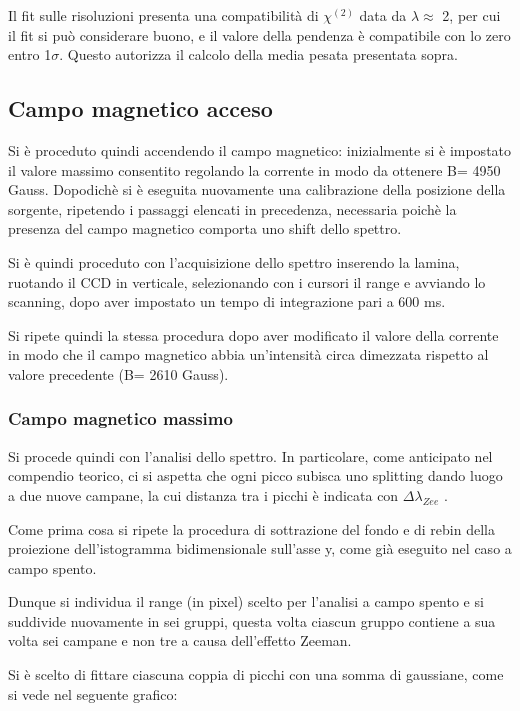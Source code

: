 \documentclass{article}
\begin{document}
	Il fit sulle risoluzioni presenta una compatibilità di $\chi^{(2)}$ data
	da $\lambda \approx$ 2, per cui il fit si può considerare buono, e il valore
	della pendenza è compatibile con lo zero entro 1$\sigma$. Questo autorizza il calcolo della media 
	pesata presentata sopra.


	\subsection*{Campo magnetico acceso}
	
	Si è proceduto quindi accendendo il campo magnetico: inizialmente si è impostato il valore massimo 
	consentito regolando la corrente in modo da ottenere B= 4950 Gauss. 
	Dopodichè si è eseguita nuovamente una calibrazione della posizione della sorgente, ripetendo i 
	passaggi elencati in precedenza, necessaria poichè la presenza del campo magnetico 
	comporta uno shift dello spettro.

	Si è quindi proceduto con l'acquisizione dello spettro inserendo la lamina, ruotando il CCD 
	in verticale, selezionando con i cursori il range e avviando lo scanning, dopo aver impostato un tempo 
	di integrazione pari a 600 ms.
	
	Si ripete quindi  la stessa procedura dopo aver modificato il valore della corrente in modo 
	che il campo magnetico abbia un'intensità circa dimezzata rispetto al valore precedente 
	(B= 2610 Gauss).
	
	\subsubsection*{Campo magnetico massimo}

	Si procede quindi con l'analisi dello spettro.
	In particolare, come anticipato nel compendio teorico, ci si aspetta che ogni picco subisca uno 
	splitting dando luogo a due nuove campane, la cui distanza tra i picchi è indicata con 
	$\Delta \lambda_{Zee} $ .
	 
	Come prima cosa si ripete la procedura di sottrazione del fondo e di rebin della proiezione 
	dell'istogramma bidimensionale sull'asse y, come già eseguito nel caso a campo spento.
	 
	Dunque si individua il range (in pixel) scelto per l'analisi a campo spento e si suddivide 
	nuovamente in sei gruppi, questa volta ciascun gruppo contiene a sua volta sei campane e 
	non tre a causa dell'effetto Zeeman.
	
	Si è scelto di fittare ciascuna coppia di picchi con una somma di gaussiane, come 
	si vede nel seguente grafico:
	
\end{document}
